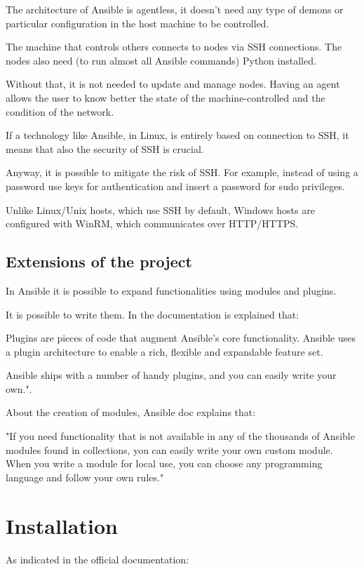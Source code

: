 \documentclass[12pt,a4paper,openright,twoside]{book}
\begin{document}
The architecture of Ansible is agentless, it doesn't need any type of demons or particular configuration in the host machine to be controlled.


The machine that controls others connects to nodes via SSH connections. The nodes also need (to run almost all Ansible commands) Python installed.


Without that, it is not needed to update and manage nodes. Having an agent allows the user to know better the state of the machine-controlled and the condition of the network.

If a technology like Ansible, in Linux, is entirely based on connection to SSH, it means that also the security of SSH is crucial.

Anyway, it is possible to mitigate the risk of SSH. For example, instead of using a password use keys for authentication and insert a password for sudo privileges\cite{ansibleSSH}.

Unlike Linux/Unix hosts, which use SSH by default, Windows hosts are configured with WinRM, which communicates over HTTP/HTTPS.

\subsection{Extensions of the project}
In Ansible it is possible to expand functionalities using modules and plugins.


It is possible to write them. In the documentation is explained that:


Plugins are pieces of code that augment Ansible's core functionality. Ansible uses a plugin architecture to enable a rich, flexible and expandable feature set.


Ansible ships with a number of handy plugins, and you can easily write your own."\cite{ansibleDocPlugins}.


About the creation of modules, Ansible doc explains that:


"If you need functionality that is not available in any of the thousands of Ansible modules found in collections, you can easily write your own custom module. When you write a module for local use, you can choose any programming language and follow your own rules."\cite{ansibleDocNewModules}

\section{Installation}
As indicated in the official documentation\cite{ansibleDocInstall}:
\end{document}

